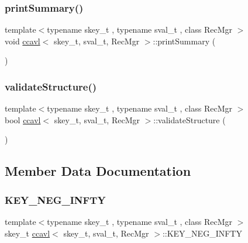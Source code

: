\mbox{\label{classccavl_a3ab44e9335cff25b627abb847477438c}} 
\subsubsection{\texorpdfstring{print\+Summary()}{printSummary()}}
{\footnotesize\ttfamily template$<$typename skey\+\_\+t , typename sval\+\_\+t , class Rec\+Mgr $>$ \\
void \hyperlink{classccavl}{ccavl}$<$ skey\+\_\+t, sval\+\_\+t, Rec\+Mgr $>$\+::print\+Summary (\begin{DoxyParamCaption}{ }\end{DoxyParamCaption})\hspace{0.3cm}{\ttfamily [inline]}}

\mbox{\label{classccavl_ac47877ab6e5def2750f5df5cda2c19be}} 
\subsubsection{\texorpdfstring{validate\+Structure()}{validateStructure()}}
{\footnotesize\ttfamily template$<$typename skey\+\_\+t , typename sval\+\_\+t , class Rec\+Mgr $>$ \\
bool \hyperlink{classccavl}{ccavl}$<$ skey\+\_\+t, sval\+\_\+t, Rec\+Mgr $>$\+::validate\+Structure (\begin{DoxyParamCaption}{ }\end{DoxyParamCaption})\hspace{0.3cm}{\ttfamily [inline]}}



\subsection{Member Data Documentation}
\mbox{\label{classccavl_ae7c30fe784d924a824eb95fc9a1536df}} 
\subsubsection{\texorpdfstring{K\+E\+Y\+\_\+\+N\+E\+G\+\_\+\+I\+N\+F\+TY}{KEY\_NEG\_INFTY}}
{\footnotesize\ttfamily template$<$typename skey\+\_\+t , typename sval\+\_\+t , class Rec\+Mgr $>$ \\
skey\+\_\+t \hyperlink{classccavl}{ccavl}$<$ skey\+\_\+t, sval\+\_\+t, Rec\+Mgr $>$\+::K\+E\+Y\+\_\+\+N\+E\+G\+\_\+\+I\+N\+F\+TY}


